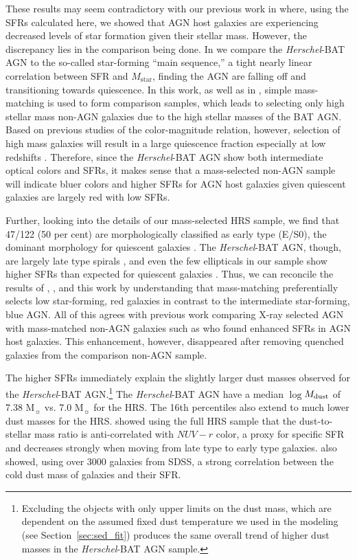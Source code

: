 \documentclass[fleqn, usenatbib]{mnras}
\newcommand{\herschel}{\emph{Herschel}}
\newcommand{\msun}{M$_{\sun}$}
\newcommand{\mstar}{$M_{\mathrm{star}}$}
\newcommand{\mdust}{$M_{\rm dust}$}
\begin{document}
These results may seem contradictory with our previous work in \citet{Shimizu:2015xo} where, using the SFRs calculated here, we showed that AGN host galaxies are experiencing decreased levels of star formation given their stellar mass. However, the discrepancy lies in the comparison being done. In \citet{Shimizu:2015xo} we compare the \herschel-BAT AGN to the so-called star-forming ``main sequence,'' a tight nearly linear correlation between SFR and \mstar \citep{Brinchmann:2004bf, Salim:2007rm, Noeske:2007fr}, finding the AGN are falling off and transitioning towards quiescence. In this work, as well as in \citet{Koss:2011vn}, simple mass-matching is used to form comparison samples, which leads to selecting only high stellar mass non-AGN galaxies due to the high stellar masses of the BAT AGN. Based on previous studies of the color-magnitude relation, however, selection of high mass galaxies will result in a large quiescence fraction especially at low redshifts  \citep{Kauffmann:2003lr, Wuyts:2011lh, Bell:2012qf}. Therefore, since the \herschel-BAT AGN show both intermediate optical colors and SFRs, it makes sense that a mass-selected non-AGN sample will indicate bluer colors and higher SFRs for AGN host galaxies given quiescent galaxies are largely red with low SFRs.

Further, looking into the details of our mass-selected HRS sample, we find that 47/122 (50 per cent) are morphologically classified as early type (E/S0), the dominant morphology for quiescent galaxies \citep{Wuyts:2011lh, Bell:2012qf}. The \herschel-BAT AGN, though, are largely late type spirals \citep{Koss:2011vn}, and even the few ellipticals in our sample show higher SFRs than expected for quiescent galaxies \citep{Shimizu:2015xo}. Thus, we can reconcile the results of \citet{Koss:2011vn}, \citet{Shimizu:2015xo}, and this work by understanding that mass-matching preferentially selects low star-forming, red galaxies in contrast to the intermediate star-forming, blue AGN. {\color{red}All of this agrees with previous work comparing X-ray selected AGN with mass-matched non-AGN galaxies such as \citet{Santini:2012ly} who found enhanced SFRs in AGN host galaxies. This enhancement, however, disappeared after removing quenched galaxies from the comparison non-AGN sample.} 

The higher SFRs immediately explain the slightly larger dust masses observed for the \herschel-BAT AGN.\footnote{Excluding the objects with only upper limits on the dust mass, which are dependent on the assumed fixed dust temperature we used in the modeling (see Section~\ref{sec:sed_fit}) produces the same overall trend of higher dust masses in the \herschel-BAT AGN sample.} The \herschel-BAT AGN  have a median $\log$\mdust{} of 7.38 \msun{} vs. 7.0 \msun{} for the HRS. The 16th percentiles also extend to much lower dust masses for the HRS. \citet{Cortese:2012xy} showed using the full HRS sample that the dust-to-stellar mass ratio is anti-correlated with $NUV-r$ color, a proxy for specific SFR and decreases strongly when moving from late type to early type galaxies. \citet{da-Cunha:2010qf} also showed, using over 3000 galaxies from SDSS, a strong correlation between the cold dust mass of galaxies and their SFR. 
\end{document}
